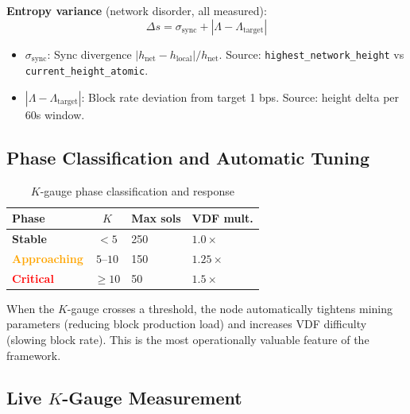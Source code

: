\documentclass[11pt,a4paper,twocolumn]{article}
\begin{document}
\textbf{Entropy variance} (network disorder, \textcolor{measured}{all measured}):
\begin{equation}
\Delta s = \sigma_{\text{sync}} + |\Lambda - \Lambda_{\text{target}}|
\end{equation}
\begin{itemize}[nosep]
    \item $\sigma_{\text{sync}}$: Sync divergence $|h_{\text{net}} - h_{\text{local}}| / h_{\text{net}}$. Source: \texttt{highest\_network\_height} vs \texttt{current\_height\_atomic}.
    \item $|\Lambda - \Lambda_{\text{target}}|$: Block rate deviation from target 1 bps. Source: height delta per 60s window.
\end{itemize}

\subsection{Phase Classification and Automatic Tuning}

\begin{table}[H]
\centering
\caption{$K$-gauge phase classification and response}
\label{tab:kphase}
\begin{tabular}{@{}lcll@{}}
\toprule
\textbf{Phase} & $K$ & \textbf{Max sols} & \textbf{VDF mult.} \\
\midrule
\textcolor{green!60!black}{\textbf{Stable}} & $<5$ & 250 & $1.0\times$ \\
\textcolor{orange}{\textbf{Approaching}} & $5$--$10$ & 150 & $1.25\times$ \\
\textcolor{red}{\textbf{Critical}} & $\geq 10$ & 50 & $1.5\times$ \\
\bottomrule
\end{tabular}
\end{table}

When the $K$-gauge crosses a threshold, the node automatically tightens mining parameters (reducing block production load) and increases VDF difficulty (slowing block rate). This is the most operationally valuable feature of the framework.

\subsection{Live $K$-Gauge Measurement}
\end{document}
